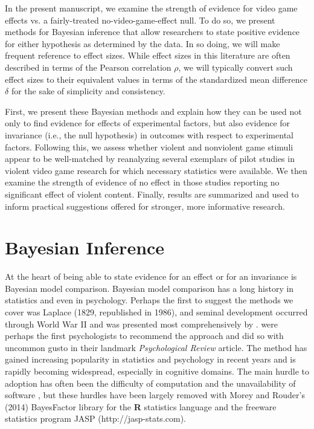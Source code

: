 \documentclass[man]{apa6}
\begin{document}
In the present manuscript, we examine the strength of evidence for video game effects vs. a fairly-treated no-video-game-effect null.  To do so, we present methods for Bayesian inference that allow researchers to state positive evidence for either hypothesis as determined by the data. In so doing, we will make frequent reference to effect sizes. While effect sizes in this literature are often described in terms of the Pearson correlation $\rho$, we will typically convert such effect sizes to their equivalent values in terms of the standardized mean difference $\delta$ for the sake of simplicity and consistency.

First, we present these Bayesian methods and explain how they can be used not only to find evidence for effects of experimental factors, but also evidence for invariance (i.e., the null hypothesis) in outcomes with respect to experimental factors. Following this, we assess whether violent and nonviolent game stimuli appear to be well-matched by reanalyzing several exemplars of pilot studies in violent video game research for which necessary statistics were available.  We then examine the strength of evidence of no effect in those studies reporting no significant effect of violent content.  Finally, results are summarized and used to inform practical suggestions offered for stronger, more informative research. 

\section{Bayesian Inference}
At the heart of being able to state evidence for an effect or for an invariance is Bayesian model comparison.  Bayesian model comparison has a long history in statistics and even in psychology.  Perhaps the first to suggest the methods we cover was Laplace (1829, republished in 1986), and seminal development occurred through World War II and was presented most comprehensively by \citet{Jeffreys:1961}.  \citet{Edwards:etal:1963} were perhaps the first psychologists to recommend the approach and did so with uncommon gusto in their landmark {\em Psychological Review} article.  The method has gained increasing popularity in statistics and psychology in recent years \citep{Berger:Delampady:1987,Gallistel:2009,Raftery:1995,Rouder:etal:2009a,Wagenmakers:2007} and is rapidly becoming widespread, especially in cognitive domains. The main hurdle to adoption has often been the difficulty of computation and the unavailability of software \citep{Gallistel:2009}, but these hurdles have been largely removed with Morey and Rouder's (2014) BayesFactor library for the {\bf R} statistics language and the freeware statistics program JASP (http://jasp-stats.com).
\end{document}
